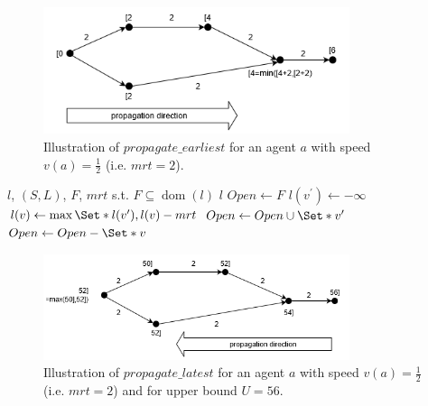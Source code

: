 \documentclass{article}
\DeclareMathOperator{\dom}{dom}
\begin{document}
\begin{figure}[hbtp]
	\centering
  \includegraphics[width=0.8\textwidth]{Figures/03_pipeline/H1_propagate_earliest.png}
	\caption{Illustration of $propagate\_earliest$ for an agent $a$ with speed $v(a)=\frac{1}{2}$ (i.e. $mrt=2$).}
	\label{fig:propagate_earliest}
\end{figure}


\begin{algorithm}
	\caption{$propagate\_latest$} \label{algo:propagate_latest}
	\begin{algorithmic}[1]
	    \Require $l$, $(S,L)$, $F$, $mrt$  s.t. $F\subseteq \dom(l)$
	    \Ensure $l$
	    \State $Open \leftarrow F$
    	        \If{$v^\prime \not\in \dom(l)$}
    	            \State $l(v^\prime) \leftarrow -\infty$
    	        \EndIf
    			\State $l(v) \leftarrow \max \Set*{l(v^\prime), l(v)-mrt}$
    			\State $Open \leftarrow Open \cup \Set*{v^\prime}$
    		\EndFor
			\State $Open \leftarrow Open - \Set*{v}$
		\EndFor
	\end{algorithmic}
\end{algorithm}


\begin{figure}[hbtp]
	\centering
  \includegraphics[width=0.8\textwidth]{Figures/03_pipeline/H1_propagate_latest.png}
	\caption{Illustration of $propagate\_latest$ for an agent $a$ with speed $v(a)=\frac{1}{2}$ (i.e. $mrt=2$) and for upper bound $U=56$.}
	\label{fig:propagate_latest}
\end{figure}
\end{document}

